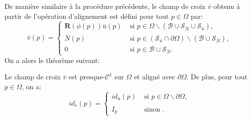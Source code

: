 De manière similaire à la procédure précédente, le champ de croix $\bar{v}$ obtenu à partir de l'opération d'alignement est défini pour tout $p\in\Omega$ par:
\begin{equation}
\bar{v}(p)=
\left\{
\begin{array}{ll}
\mathbf{R}(\phi(p))\bar{u}(p) & \mbox{ si } p\in\Omega\backslash(\mathcal{B}\cup\mathcal{S}_{\bar{N}}\cup\mathcal{S}_{\bar{u}}),\\[0.5cm]
\bar{N}(p) & \mbox{ si } p\in(\mathcal{S}_{\bar{u}}\cap\partial\Omega)\backslash(\mathcal{B}\cup\mathcal{S}_{\bar{N}}),\\[0.5cm]
0 & \mbox{ si } p\in\mathcal{B}\cup\mathcal{S}_{\bar{N}}.
\end{array}
\right.
\label{eqn:etude_def_v_second}
\end{equation}
On a alors le théorème suivant:
\begin{theorem}
\label{thm:theorem3}
Le champ de croix $\bar{v}$ est presque-$\mathcal{C}^1$ sur $\Omega$ et aligné avec $\partial\Omega$. De plus, pour tout $p\in\Omega$, on a:
\begin{equation}
id_{\bar{v}}(p)=
\left\{
\begin{array}{ll}
    id_{\bar{u}}(p) & \mbox{ si } p\in\Omega\backslash\partial\Omega,\\\\
    I_p & \mbox{ sinon }.
\end{array}
\right.
\end{equation}
\end{theorem}
